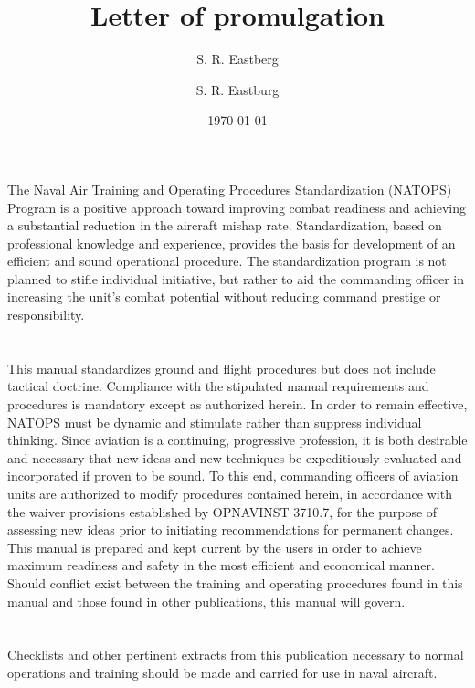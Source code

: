 \documentclass[10pt, courier]{navyletter}
\author{S. R. Eastberg}
\title{Letter of promulgation}
\date{\today}
\begin{document}
\makedateblock{}

\begin{navyletterheader}
\navysubjline{}%
\end{navyletterheader}

\section{} The Naval Air Training and Operating Procedures Standardization (NATOPS) Program is a positive approach toward improving combat readiness and achieving a substantial reduction in the aircraft mishap rate. Standardization, based on professional knowledge and experience, provides the basis for development of an efficient and sound operational procedure. The standardization program is not planned to stifle individual initiative, but rather to aid the commanding officer in increasing the unit’s combat potential without reducing command prestige or responsibility.

\section{} This manual standardizes ground and flight procedures but does not include tactical doctrine. Compliance with the stipulated manual requirements and procedures is mandatory except as authorized herein. In order to remain effective, NATOPS must be dynamic and stimulate rather than suppress individual thinking. Since aviation is a continuing, progressive profession, it is both desirable and necessary that new ideas and new techniques be expeditiously evaluated and incorporated if proven to be sound. To this end, commanding officers of aviation units are authorized to modify procedures contained herein, in accordance with the waiver provisions established by OPNAVINST 3710.7, for the purpose of assessing new ideas prior to initiating recommendations for permanent changes. This manual is prepared and kept current by the users in order to achieve maximum readiness and safety in the most efficient and economical manner. Should conflict exist between the training and operating procedures found in this manual and those found in other publications, this manual will govern.

\section{} Checklists and other pertinent extracts from this publication necessary to normal operations and training should be made and carried for use in naval aircraft.

\noclosing{}
\signspace{}
\signature{S. R. Eastburg}
\bydirection
\end{document}
